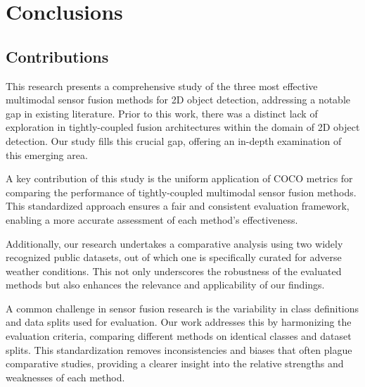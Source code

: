 \documentclass[report.tex]{subfiles}
\begin{document}
    \chapter{Conclusions}

    \section{Contributions}


    This research presents a comprehensive study of the three most effective multimodal sensor fusion methods for 2D object detection, addressing a notable gap in existing literature. Prior to this work, there was a distinct lack of exploration in tightly-coupled fusion architectures within the domain of 2D object detection. Our study fills this crucial gap, offering an in-depth examination of this emerging area.

    A key contribution of this study is the uniform application of COCO metrics for comparing the performance of tightly-coupled multimodal sensor fusion methods. This standardized approach ensures a fair and consistent evaluation framework, enabling a more accurate assessment of each method's effectiveness.

    Additionally, our research undertakes a comparative analysis using two widely recognized public datasets, out of which one is specifically curated for adverse weather conditions. This not only underscores the robustness of the evaluated methods but also enhances the relevance and applicability of our findings.

    A common challenge in sensor fusion research is the variability in class definitions and data splits used for evaluation. Our work addresses this by harmonizing the evaluation criteria, comparing different methods on identical classes and dataset splits. This standardization removes inconsistencies and biases that often plague comparative studies, providing a clearer insight into the relative strengths and weaknesses of each method.
\end{document}
